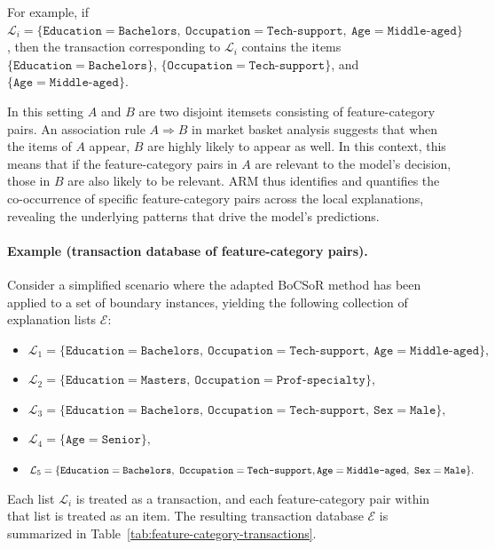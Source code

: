 For example, if $\mathcal{L}_i = \{\texttt{Education}=\texttt{Bachelors}, \ \texttt{Occupation}=\texttt{Tech-support}, \ \texttt{Age}=\texttt{Middle-aged}\}$, then the transaction corresponding to $\mathcal{L}_i$ contains the items $\{\texttt{Education}=\texttt{Bachelors}\}$, $\{\texttt{Occupation}=\texttt{Tech-support}\}$, and $\{\texttt{Age}=\texttt{Middle-aged}\}$.

In this setting $A$ and $B$ are two disjoint itemsets consisting of feature-category pairs. An association rule $A \Rightarrow B$ in market basket analysis suggests that when the items of $A$ appear, $B$ are highly likely to appear as well. In this context, this means that if the feature-category pairs in $A$ are relevant to the model's decision, those in $B$ are also likely to be relevant. ARM thus identifies and quantifies the co-occurrence of specific feature-category pairs across the local explanations, revealing the underlying patterns that drive the model's predictions.

\paragraph{Example (transaction database of feature-category pairs).} Consider a simplified scenario where the adapted BoCSoR method has been applied to a set of boundary instances, yielding the following collection of explanation lists $\mathcal{E}$:

\begin{itemize}    
  \item $\mathcal{L}_1 = \{\texttt{Education}=\texttt{Bachelors}, \ \texttt{Occupation}=\texttt{Tech-support}, \ \texttt{Age}=\texttt{Middle-aged}\},$
  \item $\mathcal{L}_2 = \{\texttt{Education}=\texttt{Masters}, \ \texttt{Occupation}=\texttt{Prof-specialty}\},$
  \item $\mathcal{L}_3 = \{\texttt{Education}=\texttt{Bachelors}, \ \texttt{Occupation}=\texttt{Tech-support}, \ \texttt{Sex}=\texttt{Male}\},$
  \item $\mathcal{L}_4 = \{\texttt{Age}=\texttt{Senior}\},$
  \item $\mathcal{L}_5 = \{\texttt{Education}=\texttt{Bachelors}, \ \texttt{Occupation}=\texttt{Tech-support}, \\ \texttt{Age}=\texttt{Middle-aged}, \ \texttt{Sex}=\texttt{Male}\}.$
\end{itemize}

Each list $\mathcal{L}_i$ is treated as a transaction, and each feature-category pair within that list is treated as an item. The resulting transaction database $\mathcal{E}$ is summarized in Table~\ref{tab:feature-category-transactions}.

